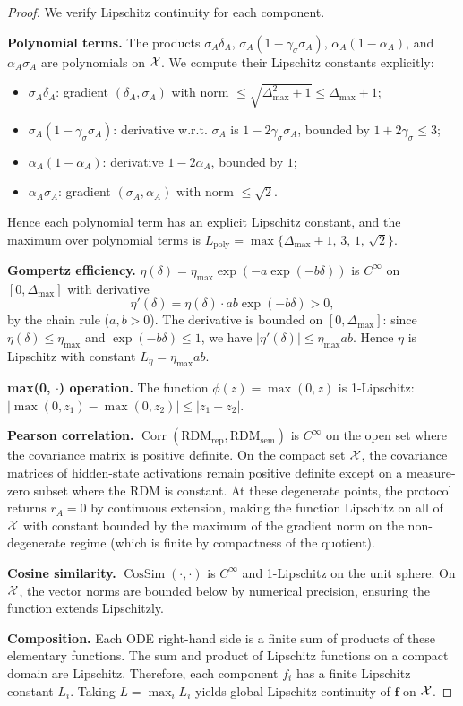 \begin{proof}
We verify Lipschitz continuity for each component.

\textbf{Polynomial terms.} The products $\sigma_A \delta_A$,
$\sigma_A (1 - \gamma_\sigma \sigma_A)$, $\alpha_A (1 - \alpha_A)$, and
$\alpha_A \sigma_A$ are polynomials on $\mathcal{X}$. We compute their Lipschitz
constants explicitly:
\begin{itemize}
  \item $\sigma_A \delta_A$: gradient $(\delta_A, \sigma_A)$ with norm
    $\leq \sqrt{\Delta_{\max}^2 + 1} \leq \Delta_{\max} + 1$;
  \item $\sigma_A (1 - \gamma_\sigma \sigma_A)$: derivative w.r.t. $\sigma_A$
    is $1 - 2\gamma_\sigma \sigma_A$, bounded by $1 + 2\gamma_\sigma \leq 3$;
  \item $\alpha_A (1 - \alpha_A)$: derivative $1 - 2\alpha_A$, bounded by $1$;
  \item $\alpha_A \sigma_A$: gradient $(\sigma_A, \alpha_A)$ with norm
    $\leq \sqrt{2}$.
\end{itemize}
Hence each polynomial term has an explicit Lipschitz constant, and the
maximum over polynomial terms is $L_{\mathrm{poly}} =
\max\{\Delta_{\max} + 1,\, 3,\, 1,\, \sqrt{2}\}$.

 \textbf{Gompertz efficiency.} $\eta(\delta) = \eta_{\max} \exp(-a \exp(-b \delta))$
is $C^\infty$ on $[0, \Delta_{\max}]$ with derivative
\[
\eta'(\delta) = \eta(\delta) \cdot a b \exp(-b \delta) > 0,
\]
by the chain rule ($a, b > 0$). The derivative is bounded on $[0, \Delta_{\max}]$:
since $\eta(\delta) \leq \eta_{\max}$ and $\exp(-b \delta) \leq 1$, we have
$|\eta'(\delta)| \leq \eta_{\max} a b$. Hence $\eta$ is Lipschitz with
constant $L_\eta = \eta_{\max} a b$.

\textbf{max(0, $\cdot$) operation.} The function $\phi(z) = \max(0, z)$ is
1-Lipschitz: $|\max(0, z_1) - \max(0, z_2)| \leq |z_1 - z_2|$.

\textbf{Pearson correlation.} $\operatorname{Corr}(\mathrm{RDM}_{\mathrm{rep}},
\mathrm{RDM}_{\mathrm{sem}})$ is $C^\infty$ on the open set where the
covariance matrix is positive definite. On the compact set $\mathcal{X}$, the
covariance matrices of hidden-state activations remain positive definite
except on a measure-zero subset where the RDM is constant. At these
degenerate points, the protocol returns $r_A = 0$ by continuous extension,
making the function Lipschitz on all of $\mathcal{X}$ with constant bounded by
the maximum of the gradient norm on the non-degenerate regime (which is
finite by compactness of the quotient).

\textbf{Cosine similarity.} $\operatorname{CosSim}(\cdot, \cdot)$ is
$C^\infty$ and 1-Lipschitz on the unit sphere. On $\mathcal{X}$, the vector norms
are bounded below by numerical precision, ensuring the function extends
Lipschitzly.

\textbf{Composition.} Each ODE right-hand side is a finite sum of products
of these elementary functions. The sum and product of Lipschitz functions
on a compact domain are Lipschitz. Therefore, each component $f_i$ has a
finite Lipschitz constant $L_i$. Taking $L = \max_i L_i$ yields global
Lipschitz continuity of $\mathbf{f}$ on $\mathcal{X}$.
\end{proof}

